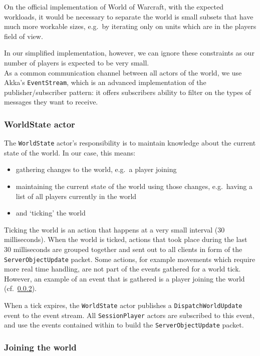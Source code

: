 \documentclass[paper=a4, fontsize=11pt]{scrartcl}
\begin{document}
On the official implementation of World of Warcraft, with the expected
workloads, it would be necessary to separate the world is small subsets that have
much more workable sizes, e.g.\ by iterating only on units which are in the
players field of view.

In our simplified implementation, however, we can ignore these constraints as
our number of players is expected to be very small.\\

As a common communication channel between all actors of the world, we use Akka's
\texttt{EventStream}, which is an advanced implementation of the
publisher/subscriber pattern: it offers subscribers ability to filter on the
types of messages they want to receive.

\subsubsection{WorldState actor}

The \texttt{WorldState} actor's responsibility is to maintain knowledge about
the current state of the world.
In our case, this means:
\begin{itemize}
    \item gathering changes to the world, e.g.\ a player joining
    \item maintaining the current state of the world using those changes, e.g.\
        having a list of all players currently in the world
    \item and `ticking' the world
\end{itemize}

Ticking the world is an action that happens at a very small interval (30
milliseconds).
When the world is ticked, actions that took place during the last 30
milliseconds are grouped together and sent out to all clients in form of the
\texttt{ServerObjectUpdate} packet.
Some actions, for example movements which require more real time handling,
are not part of the events gathered for a world tick. However, an example of an
event that is gathered is a player joining the world (cf.~\ref{jtw}).

When a tick expires, the \texttt{WorldState} actor publishes a
\texttt{DispatchWorldUpdate} event to the event stream.
All \texttt{SessionPlayer} actors are subscribed to this event, and use the
events contained within to build the \texttt{ServerObjectUpdate} packet.

\subsubsection{Joining the world}\label{jtw}
\end{document}
